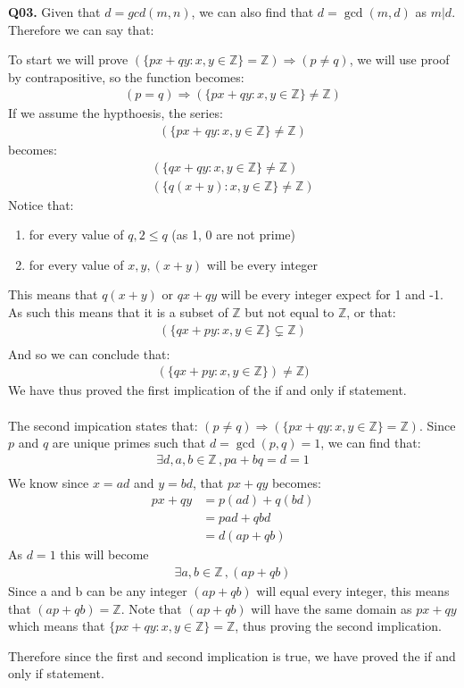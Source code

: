 \documentclass[11pt]{article}
\begin{document}
\textbf{Q03.} Given that $d=gcd(m,n)$, we can also find that $d = \gcd(m,d)$ as $m|d$. Therefore we can say that:



To start we will prove $(\{px + qy \colon x, y \in \mathbb Z\} = \mathbb Z)  \Longrightarrow ( p \neq q)$, we will use proof by contrapositive, so the function becomes:
\begin{align*}
(p = q) \Longrightarrow (\{px + qy \colon x, y \in \mathbb Z\} \neq \mathbb Z)
\end{align*}
If we assume the hypthoesis, the series:
\begin{align*}
 (\{px + qy \colon x, y \in \mathbb Z\} \neq \mathbb Z)
\end{align*}
becomes:
\begin{align*}
 (\{qx + qy \colon x, y \in \mathbb Z\} \neq \mathbb Z)\\
 (\{q(x + y) \colon x, y \in \mathbb Z\} \neq \mathbb Z)
\end{align*}
Notice that:
\begin{enumerate}
\item for every value of $q, 2 \leq q$ (as 1, 0 are not prime)

\item for every value of $x, y, (x+y)$ will be every integer
\end{enumerate}
This means that $q(x+y)$ or $qx + qy$ will be every integer expect for 1 and -1. As such this means that it is a subset of $\mathbb Z$ but not equal to $\mathbb Z$, or that:
\begin{align*}
 (\{qx + py \colon x, y \in \mathbb Z\} \subsetneq \mathbb Z)\\
\end{align*}
And so we can conclude that:
\begin{align*}
 (\{qx + py \colon x, y \in \mathbb Z\} )\neq \mathbb Z)
\end{align*}
We have thus proved the first implication of the if and only if statement.\\\\
The second impication states that: $( p \neq q) \Longrightarrow (\{px + qy \colon x, y \in \mathbb Z\} = \mathbb Z) $. Since $p$ and $q$ are unique primes such that $d = \gcd(p,q) = 1$, we can find that:
\begin{align*}
 \exists  d, a, b  \in  \mathbb Z\,, pa + bq = d = 1\\
\end{align*}
We know since $x = ad$  and $y = bd$,  that $px + qy$ becomes:
\begin{align*}
px + qy & = p(ad) + q(bd)\\
& = pad + qbd\\
& = d(ap + qb)
\end{align*}
As $d = 1$ this will become
\begin{align*}
 \exists  a, b  \in  \mathbb Z\,,(ap+qb)
\end{align*}
Since a and b can be any integer $(ap+qb) $ will equal every integer, this means that $(ap+qb) = \mathbb Z$. Note that $(ap+qb)$ will have the same domain as $ px + qy$ which means  that $ \{px + qy \colon x, y \in \mathbb Z\} = \mathbb Z$, thus proving the second implication.

Therefore since the first and second implication is true, we have proved the if and only if statement.
\end{document}
